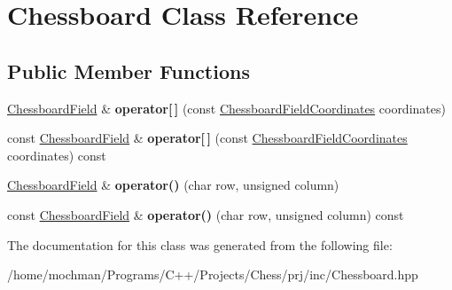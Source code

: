\hypertarget{class_chessboard}{\section{Chessboard Class Reference}
\label{class_chessboard}
}
\subsection*{Public Member Functions}
\begin{DoxyCompactItemize}
\item 
\hypertarget{class_chessboard_a4f9264e05a92a5568a7c04e5a4f99547}{\hyperlink{class_chessboard_field}{Chessboard\-Field} \& {\bfseries operator\mbox{[}$\,$\mbox{]}} (const \hyperlink{class_chessboard_field_coordinates}{Chessboard\-Field\-Coordinates} coordinates)}\label{class_chessboard_a4f9264e05a92a5568a7c04e5a4f99547}

\item 
\hypertarget{class_chessboard_abee041e316952d863b5d7e80290ee85f}{const \hyperlink{class_chessboard_field}{Chessboard\-Field} \& {\bfseries operator\mbox{[}$\,$\mbox{]}} (const \hyperlink{class_chessboard_field_coordinates}{Chessboard\-Field\-Coordinates} coordinates) const }\label{class_chessboard_abee041e316952d863b5d7e80290ee85f}

\item 
\hypertarget{class_chessboard_af191ad6f74f5b2a26387a65a4f65e228}{\hyperlink{class_chessboard_field}{Chessboard\-Field} \& {\bfseries operator()} (char row, unsigned column)}\label{class_chessboard_af191ad6f74f5b2a26387a65a4f65e228}

\item 
\hypertarget{class_chessboard_a76f98b5cc90be0f4061f1780050937de}{const \hyperlink{class_chessboard_field}{Chessboard\-Field} \& {\bfseries operator()} (char row, unsigned column) const }\label{class_chessboard_a76f98b5cc90be0f4061f1780050937de}

\end{DoxyCompactItemize}


The documentation for this class was generated from the following file\-:\begin{DoxyCompactItemize}
\item 
/home/mochman/\-Programs/\-C++/\-Projects/\-Chess/prj/inc/Chessboard.\-hpp\end{DoxyCompactItemize}
